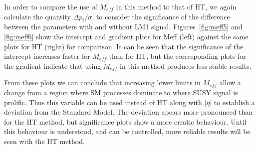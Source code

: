 In order to compare the use of $M_{eff}$ in this method to that of HT, we again calculate the quantity $\Delta p_{i} / \sigma$, to consider the significance of the difference between the parameters with and without LM1 signal. Figures~\ref{fig:meff5} and \ref{fig:meff6} show the intercept and gradient plots for Meff (left) against the same plots for HT (right) for comparison. It can be seen that the significance of the intercept increases faster for $M_{eff}$ than for HT, but the corresponding plots for the gradient indicate that using $M_{eff}$ in this method produces less stable results. 

From these plots we can conclude that increasing lower limits in $M_{eff}$ allow a change from a region where SM processes dominate to where SUSY signal is prolific. Thus this variable can be used instead of HT along with $|\eta|$ to establish a deviation from the Standard Model. The deviation apears more pronounced than for the HT method, but significance plots show a more erratic behaviour. Until this behaviour is understood, and can be controlled, more reliable results will be seen with the HT method. 




 




